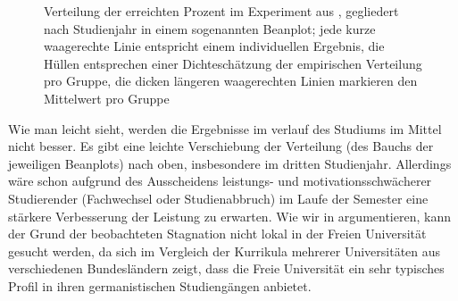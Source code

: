 \begin{figure}[htpb]
  \centering
  \caption{Verteilung der erreichten Prozent im Experiment aus \citet{SchaeferSayatz2017a}, gegliedert nach Studienjahr in einem sogenannten Beanplot; jede kurze waagerechte Linie entspricht einem individuellen Ergebnis, die Hüllen entsprechen einer Dichteschätzung der empirischen Verteilung pro Gruppe, die dicken längeren waagerechten Linien markieren den Mittelwert pro Gruppe}
  \label{fig:grammatikkentnissevonstudierenden002}
\end{figure}

Wie man leicht sieht, werden die Ergebnisse im verlauf des Studiums im Mittel nicht besser.
Es gibt eine leichte Verschiebung der Verteilung (des Bauchs der jeweiligen Beanplots) nach oben, insbesondere im dritten Studienjahr.
Allerdings wäre schon aufgrund des Ausscheidens leistungs- und motivationsschwächerer Studierender (Fachwechsel oder Studienabbruch) im Laufe der Semester eine stärkere Verbesserung der Leistung zu erwarten.
Wie wir in \citet[242--243]{SchaeferSayatz2017a} argumentieren, kann der Grund der beobachteten Stagnation nicht lokal in der Freien Universität gesucht werden, da sich im Vergleich der Kurrikula mehrerer Universitäten aus verschiedenen Bundesländern zeigt, dass die Freie Universität ein sehr typisches Profil in ihren germanistischen Studiengängen anbietet.

